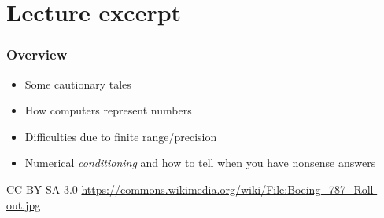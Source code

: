 \documentclass[presentation]{beamer}
\begin{document}
\section{Lecture excerpt}

\begin{frame}
  \frametitle{Overview}
  \begin{itemize}
  \item Some cautionary tales
  \item How computers represent numbers
  \item Difficulties due to finite range/precision
  \item Numerical \emph{conditioning} and how to tell when you have
    nonsense answers
  \end{itemize}
\end{frame}

\begin{frame}[plain,t]
  \begin{flushright}
      \tiny CC BY-SA 3.0
      \url{https://commons.wikimedia.org/wiki/File:Boeing_787_Roll-out.jpg}
  \end{flushright}
\end{frame}
\end{document}
